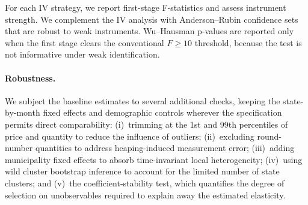 For each IV strategy, we report first-stage F-statistics and assess instrument strength.  We complement the IV analysis with Anderson--Rubin confidence sets that are robust to weak instruments.  Wu--Hausman p-values are reported only when the first stage clears the conventional $F \geq 10$ threshold, because the test is not informative under weak identification.

\paragraph{Robustness.}
We subject the baseline estimates to several additional checks, keeping the state-by-month fixed effects and demographic controls wherever the specification permits direct comparability: (i)~trimming at the 1st and 99th percentiles of price and quantity to reduce the influence of outliers; (ii)~excluding round-number quantities to address heaping-induced measurement error; (iii)~adding municipality fixed effects to absorb time-invariant local heterogeneity; (iv)~using wild cluster bootstrap inference to account for the limited number of state clusters; and (v)~the \citet{oster2019unobservable} coefficient-stability test, which quantifies the degree of selection on unobservables required to explain away the estimated elasticity.
